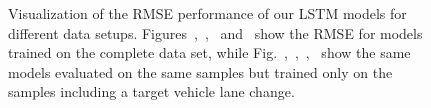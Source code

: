 \begin{figure}[th!]
{    }
    \caption{Visualization of the \ac{RMSE} performance of our \ac{LSTM} models for different data setups.
    Figures~\protect{},~\protect{},~\protect{} and~\protect{} show the \ac{RMSE} for models trained on the complete data set, while
Fig.~\protect{},~\protect{},~\protect{},~\protect{} show the same models evaluated on the same samples but trained only on the samples including a target vehicle lane change.}
    \label{fig:rmse_on_board_training_data_variation}
\end{figure}

